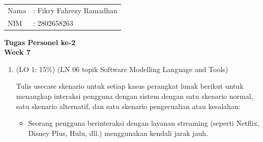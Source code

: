 \documentclass[a4paper]{article}
\begin{document}
\pagestyle{empty}

\begin{tabular}{@{}l l@{}}
Nama & : Fikry Fahrezy Ramadhan \\
NIM & : 2802658263 \\
\end{tabular}

\begin{center}
    {\LARGE \textbf{Tugas Personel ke-2}}\\[0.5em]
    {\Large \textbf{Week 7}}
\end{center}

\begin{enumerate}[itemsep=1em]
  \item (LO 1: 15\%) (LN 06 topik Software Modelling Language and Tools)
  
  Tulis usecase skenario untuk setiap kasus perangkat lunak berikut untuk menangkap interaksi pengguna dengan sistem dengan satu skenario normal, satu skenario alternatif, dan satu skenario pengecualian atau kesalahan:

  \begin{itemize}[itemsep=1em]
    \item Seorang pengguna berinteraksi dengan layanan streaming (seperti Netflix, Disney Plus, Hulu, dll.) menggunakan kendali jarak jauh.

    \vspace{1em}


    \vspace{1em}


\end{itemize}
\end{enumerate}
\end{document}
